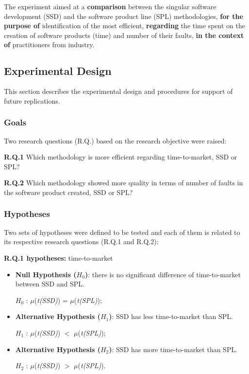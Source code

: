 The experiment aimed at a \textbf{comparison} between the singular software development (SSD) and the software product line (SPL) methodologies, \textbf{for the purpose of} identification of the most efficient, \textbf{regarding} the time spent on the creation of software products (time) and number of their faults, \textbf{in the context of} practitioners from industry.


\subsection{Experimental Design}\label{sub:design}

This section describes the experimental design and procedures for support of future replications.

\subsubsection{Goals}

Two research questions (R.Q.) based on the research objective were raised:

\textbf{R.Q.1} Which methodology is more efficient regarding time-to-market, SSD or SPL?

\textbf{R.Q.2} Which methodology showed more quality in terms of number of faults in the software product created, SSD or SPL?

\subsubsection{Hypotheses}

Two sets of hypotheses were defined to be tested and each of them is related to its respective research questions (R.Q.1 and R.Q.2):

\textbf{R.Q.1 hypotheses:} time-to-market

	\begin{itemize}
	
	\item \textbf{Null Hypothesis ($H_{0}$)}: there is no significant difference of time-to-market between SSD and SPL.
	
	$H_{0}$ : $\mu$(\textit{t(SSD)}) =  $\mu$(\textit{t(SPL)});
	
	\item \textbf{Alternative Hypothesis ($H_{1}$)}: SSD has less time-to-market than SPL.
	
	$H_{1}$ : $\mu$(\textit{t(SSD)}) $<$ $\mu$(\textit{t(SPL)});
		
	
	\item \textbf{Alternative Hypothesis ($H_{2}$)}: SSD has more time-to-market than SPL.
	
	$H_{2}$ :  $\mu$(\textit{t(SSD)}) $>$ $\mu$(\textit{t(SPL)}).		
	
	\end{itemize}	

